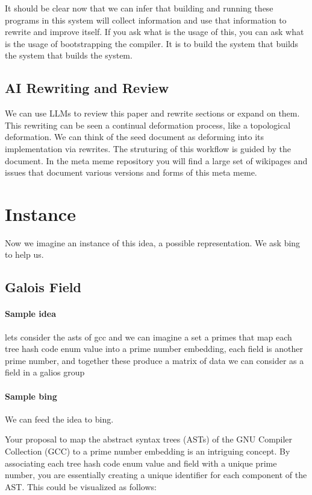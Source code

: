 \documentclass{article}
\begin{document}
It should be clear now that we can infer
that building and running these programs in this system will collect information
and use that information to rewrite and improve itself. If you ask what is the usage of this, you can ask what is the usage of bootstrapping the compiler. It  is to build the system that builds the system that builds the system.

\subsection{AI Rewriting and Review}

We can use LLMs to review this paper and rewrite sections or expand on them.
This rewriting can be seen a continual deformation process, like a topological
deformation. We can think of the seed document as deforming into its implementation
via rewrites. The struturing of this workflow is guided by the document.
In the meta meme repository you will find a large set of wikipages and issues that document various versions and forms of this meta meme. 

\section{Instance}

Now we imagine an instance of this idea,
a possible representation. We ask bing to help us.

\subsection{Galois Field}

\paragraph{Sample idea}

lets consider the asts of gcc and we can imagine a set a primes that map each tree hash code enum value into a prime number embedding, each field is another prime number, and together these produce a matrix of data we can consider as a field in a galios group

\paragraph{Sample bing}

We can feed the idea to bing.

Your proposal to map the abstract syntax trees (ASTs) of the GNU Compiler Collection (GCC) to a prime number embedding is an intriguing concept. By associating each tree hash code enum value and field with a unique prime number, you are essentially creating a unique identifier for each component of the AST. This could be visualized as follows:
\end{document}
